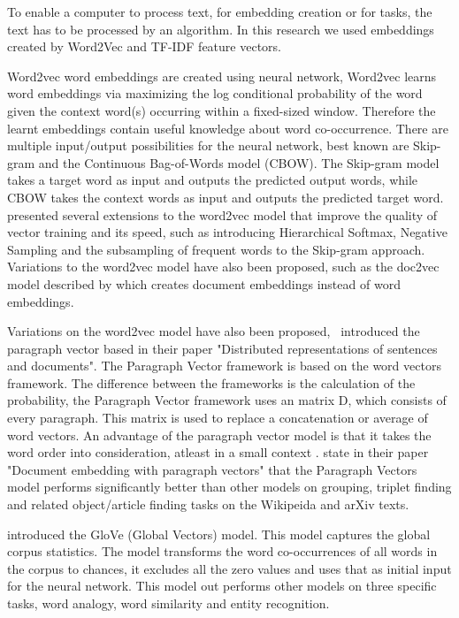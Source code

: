 \documentclass[../../Thesis.tex]{subfiles}
\begin{document}
To enable a computer to process text, for embedding creation or for tasks, the text has to be processed by an algorithm. In this research we used embeddings created by Word2Vec and TF-IDF feature vectors.
\begin{jumpin}
Word2vec word embeddings are created using neural network, Word2vec learns word embeddings via maximizing the log conditional probability of the word given the context word(s) occurring within a fixed-sized window. Therefore the learnt embeddings contain useful knowledge about word co-occurrence\cite{nalisnick2016improving}. There are multiple input/output possibilities for the neural network, best known are Skip-gram and the Continuous Bag-of-Words model (CBOW). The Skip-gram model takes a target word as input and outputs the predicted output words, while CBOW takes the context words as input and outputs the predicted target word\cite{nalisnick2016improving, pennington2014glove}. \citet{mikolov2013distributed}\cite{mikolov2013efficient} presented several extensions to the word2vec model that improve the quality of vector training and its speed, such as introducing Hierarchical Softmax, Negative Sampling and the subsampling of frequent words to the Skip-gram approach. Variations to the word2vec model have also been proposed, such as the doc2vec model described by \citet{lau2016empirical} which creates document embeddings instead of word embeddings.

Variations on the word2vec model have also been proposed,~\citet{le2014distributed} introduced the paragraph vector based in their paper "Distributed representations of sentences and documents". The Paragraph Vector framework is based on the word vectors framework. The difference between the frameworks is the calculation of the probability, the Paragraph Vector framework uses an matrix D, which consists of every paragraph. This matrix is used to replace a concatenation or average of word vectors. An advantage of the paragraph vector model is that it takes the word order into consideration, atleast in a small context \cite{le2014distributed}. \citet{dai2015document} state in their paper "Document embedding with paragraph vectors" that the Paragraph Vectors model performs significantly better than other models on grouping, triplet finding and related object/article finding tasks on the Wikipeida and arXiv texts.

\citet{pennington2014glove} introduced the GloVe (Global Vectors) model. This model captures the global corpus statistics. The model transforms the word co-occurrences of all words in the corpus to chances, it excludes all the zero values and uses that as initial input for the neural network. This model out performs other models on three specific tasks, word analogy, word similarity and entity recognition.\\


\end{jumpin}
\end{document}
